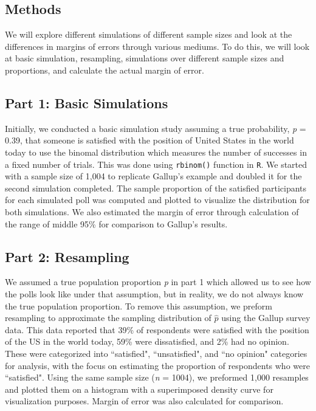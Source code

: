 \documentclass{article}\usepackage[]{graphicx}\usepackage[]{xcolor}
\begin{document}
\begin{multicols}{2}
\section{Methods}
We will explore different simulations of different sample sizes and look at the differences in margins of errors through various mediums. To do this, we will look at basic simulation, resampling, simulations over different sample sizes and proportions, and calculate the actual margin of error. 

\subsection{Part 1: Basic Simulations}
Initially, we conducted a basic simulation study assuming a true probability, \emph{p} = 0.39, that someone is satisfied with the position of United States in the world today to use the binomal distribution which measures the number of successes in a fixed number of trials. This was done using \texttt{rbinom()} function in \texttt{R}. We started with a sample size of 1,004 to replicate Gallup's example and doubled it for the second simulation completed. The sample proportion of the satisfied participants for each simulated poll was computed and plotted to visualize the distribution for both simulations. We also estimated the margin of error through calculation of the range of middle 95\% for comparison to Gallup's results. 

\subsection{Part 2: Resampling}

We assumed a true population proportion \emph{p} in part 1 which allowed us to see how the polls look like under that assumption, but in reality, we do not always know the true population proportion. To remove this assumption, we preform resampling to approximate the sampling distribution of \(\hat{p}\) using the Gallup survey data. This data reported that 39\% of respondents were satisfied with the position of the US in the world today, 59\% were dissatisfied, and 2\% had no opinion. These were categorized into ``satisfied", ``unsatisfied", and ``no opinion" categories for analysis, with the focus on estimating the proportion of respondents who were ``satisfied". Using the same sample size (\emph{n} = 1004), we preformed 1,000 resamples and plotted them on a histogram with a superimposed density curve for visualization purposes. Margin of error was also calculated for comparison. 


\end{multicols}
\end{document}
